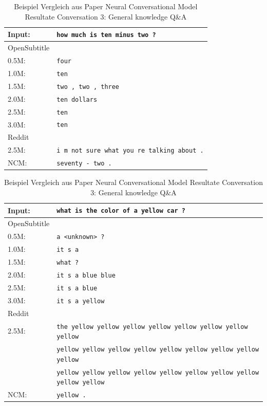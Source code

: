 \begin{table}[H]
	\centering
	\begin{adjustbox}{max width=\textwidth}
		\begin{tabular}{ll}
			\toprule
			Input: 	& \texttt{how much is ten minus two ?}\\
			\midrule
			OpenSubtitle\\
			0.5M: 	& \texttt{four}\\
			1.0M: 	& \texttt{ten}\\
			1.5M:	& \texttt{two , two , three}\\
			2.0M:	& \texttt{ten dollars}\\
			2.5M:	& \texttt{ten}\\
			3.0M:	& \texttt{ten}\\
			\midrule
			Reddit\\
			2.5M:	& \texttt{i m not sure what you re talking about .}\\
			\midrule
			NCM:	& \texttt{seventy - two .}\\
			\bottomrule
		\end{tabular}
	\end{adjustbox}
	\caption{Beispiel Vergleich aus Paper Neural Conversational Model Resultate Conversation 3: General knowledge Q\&A}
	\label{results:example11_output: Neural_Conversational_Model_compared}
\end{table}
\begin{table}[H]
	\centering
	\begin{adjustbox}{max width=\textwidth}
		\begin{tabular}{ll}
			\toprule
			Input: 	& \texttt{what is the color of a yellow car ?}\\
			\midrule
			OpenSubtitle\\
			0.5M: 	& \texttt{a <unknown> ?}\\
			1.0M: 	& \texttt{it s a}\\
			1.5M:	& \texttt{what ?}\\
			2.0M:	& \texttt{it s a blue blue}\\
			2.5M:	& \texttt{it s a blue}\\
			3.0M:	& \texttt{it s a yellow}\\
			\midrule
			Reddit\\
			2.5M:	& \texttt{the yellow yellow yellow yellow yellow yellow yellow yellow}\\
					& \texttt{yellow yellow yellow yellow yellow yellow yellow yellow yellow}\\
					& \texttt{yellow yellow yellow yellow yellow yellow yellow yellow yellow yellow}\\
					\midrule
			NCM:	& \texttt{yellow .}\\
			\bottomrule
		\end{tabular}
	\end{adjustbox}
	\caption{Beispiel Vergleich aus Paper Neural Conversational Model Resultate Conversation 3: General knowledge Q\&A}
	\label{results:example12_output: Neural_Conversational_Model_compared}
\end{table}
